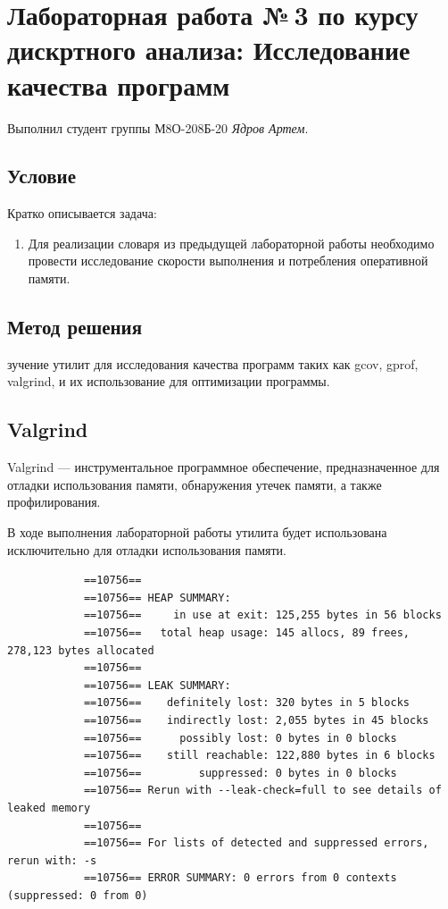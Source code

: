 \documentclass[12pt]{article}
\begin{document}
	
	\section*{Лабораторная работа №\,3 по курсу дискртного анализа: Исследование качества программ}
	
	Выполнил студент группы М8О-208Б-20 \textit{Ядров Артем}.
	
	\subsection*{Условие}
	
	Кратко описывается задача: 
	\begin{enumerate}
		\item Для реализации словаря из предыдущей лабораторной работы необходимо провести исследование скорости выполнения и потребления оперативной памяти.
	\end{enumerate}
	
	\subsection*{Метод решения}
	
	зучение утилит для исследования качества программ таких как gcov, gprof, valgrind, и их использование для оптимизации программы.
	
	\subsection*{Valgrind}
	
	Valgrind — инструментальное программное обеспечение, предназначенное для отладки использования памяти, обнаружения утечек памяти, а также профилирования.
	
	В ходе выполнения лабораторной работы утилита будет использована исключительно для отладки использования памяти.
	
	\begin{small}
		\begin{verbatim}
			==10756== 
			==10756== HEAP SUMMARY:
			==10756==     in use at exit: 125,255 bytes in 56 blocks
			==10756==   total heap usage: 145 allocs, 89 frees, 278,123 bytes allocated
			==10756== 
			==10756== LEAK SUMMARY:
			==10756==    definitely lost: 320 bytes in 5 blocks
			==10756==    indirectly lost: 2,055 bytes in 45 blocks
			==10756==      possibly lost: 0 bytes in 0 blocks
			==10756==    still reachable: 122,880 bytes in 6 blocks
			==10756==         suppressed: 0 bytes in 0 blocks
			==10756== Rerun with --leak-check=full to see details of leaked memory
			==10756== 
			==10756== For lists of detected and suppressed errors, rerun with: -s
			==10756== ERROR SUMMARY: 0 errors from 0 contexts (suppressed: 0 from 0)
		\end{verbatim}
	\end{small}
\end{document}
